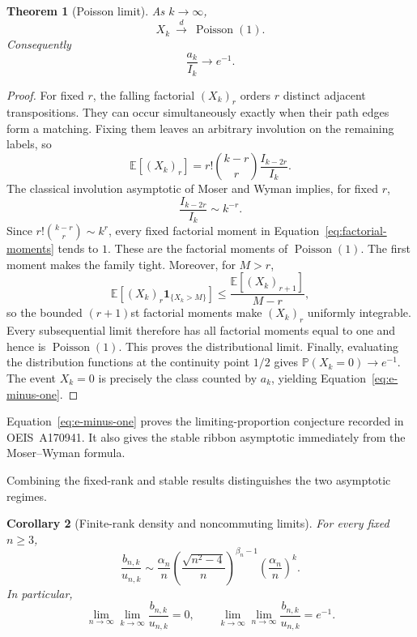 \documentclass[11pt]{article}
\newtheorem{theorem}{Theorem}[section]
\newtheorem{corollary}[theorem]{Corollary}
\theoremstyle{definition}
\begin{document}
\begin{theorem}[Poisson limit]\label{thm:poisson}
As $k\to\infty$,
\[
 X_k\ \xrightarrow{d}\ \operatorname{Poisson}(1).
\]
Consequently
\begin{equation}\label{eq:e-minus-one}
 \frac{a_k}{I_k}\longrightarrow e^{-1}.
\end{equation}
\end{theorem}

\begin{proof}
For fixed $r$, the falling factorial $(X_k)_r$ orders $r$ distinct adjacent
transpositions.  They can occur simultaneously exactly when their path edges
form a matching.  Fixing them leaves an arbitrary involution on the remaining
labels, so
\begin{equation}\label{eq:factorial-moments}
 \mathbb E[(X_k)_r]
 =r!\binom{k-r}{r}\frac{I_{k-2r}}{I_k}.
\end{equation}
The classical involution asymptotic of Moser and Wyman
\cite{MoserWyman1955} implies, for fixed $r$,
\[
 \frac{I_{k-2r}}{I_k}\sim k^{-r}.
\]
Since $r!\binom{k-r}{r}\sim k^r$, every fixed factorial moment in
Equation~\eqref{eq:factorial-moments} tends to $1$.  These are the factorial
moments of $\operatorname{Poisson}(1)$.  The first moment makes the family
tight.  Moreover, for $M>r$,
\[
 \mathbb E\!\left[(X_k)_r\mathbf1_{\{X_k>M\}}\right]
 \le \frac{\mathbb E[(X_k)_{r+1}]}{M-r},
\]
so the bounded $(r+1)$st factorial moments make $(X_k)_r$ uniformly
integrable.  Every subsequential limit therefore has all factorial moments
equal to one and hence is $\operatorname{Poisson}(1)$.  This proves the
distributional limit.  Finally, evaluating the distribution functions at
the continuity point $1/2$ gives
$\mathbb P(X_k=0)\to e^{-1}$.  The event $X_k=0$ is precisely the class
counted by $a_k$, yielding Equation~\eqref{eq:e-minus-one}.
\end{proof}

Equation~\eqref{eq:e-minus-one} proves the limiting-proportion conjecture
recorded in OEIS~A170941.  It also gives the stable ribbon asymptotic
immediately from the Moser--Wyman formula.

Combining the fixed-rank and stable results distinguishes the two asymptotic
regimes.

\begin{corollary}[Finite-rank density and noncommuting limits]
For every fixed $n\ge3$,
\begin{equation}\label{eq:fixed-rank-density}
 \frac{b_{n,k}}{u_{n,k}}\sim
 \frac{\alpha_n}{n}
 \left(\frac{\sqrt{n^2-4}}n\right)^{\beta_n-1}
 \left(\frac{\alpha_n}{n}\right)^k.
\end{equation}
In particular,
\begin{equation}\label{eq:noncommuting-limits}
 \lim_{n\to\infty}\lim_{k\to\infty}\frac{b_{n,k}}{u_{n,k}}=0,
 \qquad
 \lim_{k\to\infty}\lim_{n\to\infty}\frac{b_{n,k}}{u_{n,k}}=e^{-1}.
\end{equation}
\end{corollary}
\end{document}
